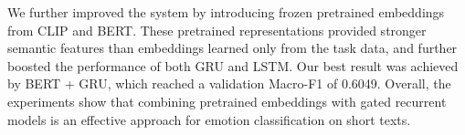 \documentclass[10pt,twocolumn,letterpaper]{article}
\begin{document}
\noindent We further improved the system by introducing frozen pretrained embeddings from CLIP and BERT. These pretrained representations provided stronger semantic features than embeddings learned only from the task data, and further boosted the performance of both GRU and LSTM. Our best result was achieved by BERT + GRU, which reached a validation Macro-F1 of 0.6049. Overall, the experiments show that combining pretrained embeddings with gated recurrent models is an effective approach for emotion classification on short texts.
\end{document}
